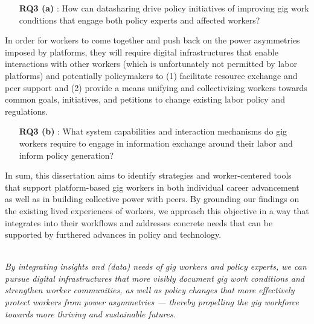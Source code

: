 \begin{enumerate}
    \item [\textbf{RQ3 (a)}]: How can datasharing drive policy initiatives of improving gig work conditions that engage both policy experts and affected workers? \cite{supporting}

\end{enumerate}

In order for workers to come together and push back on the power asymmetries imposed by platforms, they will require digital infrastructures that enable interactions with other workers (which is unfortunately not permitted by labor platforms) and potentially policymakers to (1) facilitate resource exchange and peer support and (2) provide a means unifying and collectivizing workers towards common goals, initiatives, and petitions to change existing labor policy and regulations. 

\begin{enumerate}
    \item [\textbf{RQ3 (b)}]: What system capabilities and interaction mechanisms do gig workers require to engage in information exchange around their labor and inform policy generation? \cite{gig2gether}
\end{enumerate}

In sum, this dissertation aims to identify strategies and worker-centered tools that support platform-based gig workers in both individual career advancement as well as in building collective power with peers. By grounding our findings on the existing lived experiences of workers, we approach this objective in a way that integrates into their workflows and addresses concrete needs that can be supported by furthered advances in policy and technology. \\ \\
\begin{tcolorbox}[colback=maroon!10,
colframe=maroon!60,
fonttitle=\bfseries,
fontupper=\normalsize\selectfont, 
title=\textbf{Thesis Statement}]
\textit{By integrating insights and (data) needs of gig workers and policy experts, we can pursue digital infrastructures that more visibly document gig work conditions and strengthen worker communities, as well as policy changes that more effectively protect workers from power asymmetries  --- thereby propelling the gig workforce towards more thriving and sustainable futures.
}
\end{tcolorbox}